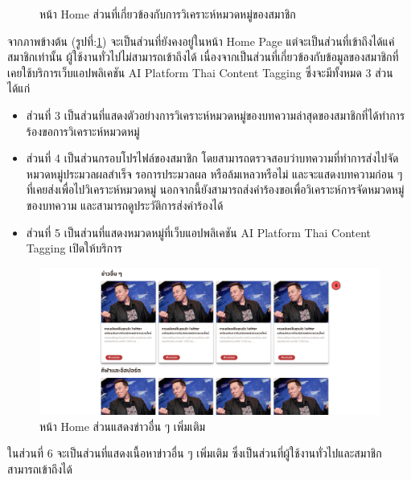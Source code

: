 \documentclass[12pt,oneside,openright,a4paper]{cpe-thai-project}
\begin{document}
\begin{itemize}
\begin{figure}[!ht]
  \caption{หน้า Home ส่วนที่เกี่ยวข้องกับการวิเคราะห์หมวดหมู่ของสมาชิก}\label{fig:homepage2} 
\end{figure}
\hspace*{1cm}จากภาพข้างต้น (รูปที่:\ref{fig:homepage2}) จะเป็นส่วนที่ยังคงอยู่ในหน้า Home Page แต่จะเป็นส่วนที่เข้าถึงได้แค่สมาชิกเท่านั้น ผู้ใช้งานทั่วไปไม่สามารถเข้าถึงได้
เนื่องจากเป็นส่วนที่เกี่ยวข้องกับข้อมูลของสมาชิกที่เคยใช้บริการเว็บแอปพลิเคชัน AI Platform Thai Content Tagging ซึ่งจะมีทั้งหมด 3 ส่วน ได้แก่
\begin{itemize}
  \item ส่วนที่ 3 เป็นส่วนที่แสดงตัวอย่างการวิเคราะห์หมวดหมู่ของบทความล่าสุดของสมาชิกที่ได้ทำการร้องขอการวิเคราะห์หมวดหมู่ 
  \item ส่วนที่ 4 เป็นส่วนกรอบโปรไฟล์ของสมาชิก โดยสามารถตรวจสอบว่าบทความที่ทำการส่งไปจัดหมวดหมู่ประมวลผลสำเร็จ รอการประมวลผล หรือล้มเหลวหรือไม่ 
  และจะแสดงบทความก่อน ๆ ที่เคยส่งเพื่อไปวิเคราะห์หมวดหมู่ นอกจากนี้ยังสามารถส่งคำร้องขอเพื่อวิเคราะห์การจัดหมวดหมู่ของบทความ
  และสามารถดูประวัติการส่งคำร้องได้
  \item ส่วนที่ 5 เป็นส่วนที่แสดงหมวดหมู่ที่เว็บแอปพลิเคชัน AI Platform Thai Content Tagging เปิดให้บริการ
\end{itemize}
\begin{figure}[!ht]\centering
  \includegraphics[width=14cm]{./img/project_ui/other_new.png} 
  \caption{หน้า Home ส่วนแสดงข่าวอื่น ๆ เพิ่มเติม}\label{fig:other_new} 
\end{figure}
\hspace*{1cm}ในส่วนที่ 6 จะเป็นส่วนที่แสดงเนื้อหาข่าวอื่น ๆ เพิ่มเติม ซึ่งเป็นส่วนที่ผู้ใช้งานทั่วไปและสมาชิกสามารถเข้าถึงได้ \newpage


\end{itemize}
\end{document}
